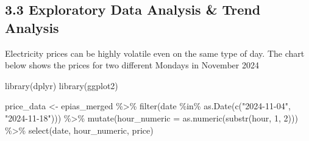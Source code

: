 \documentclass[
  11pt,
  a4paper,
]{article}
\newenvironment{Shaded}{\begin{snugshade}}{\end{snugshade}}
\newcommand{\AttributeTok}[1]{\textcolor[rgb]{0.40,0.45,0.13}{#1}}
\newcommand{\DecValTok}[1]{\textcolor[rgb]{0.68,0.00,0.00}{#1}}
\newcommand{\FunctionTok}[1]{\textcolor[rgb]{0.28,0.35,0.67}{#1}}
\newcommand{\NormalTok}[1]{\textcolor[rgb]{0.00,0.23,0.31}{#1}}
\newcommand{\OtherTok}[1]{\textcolor[rgb]{0.00,0.23,0.31}{#1}}
\newcommand{\SpecialCharTok}[1]{\textcolor[rgb]{0.37,0.37,0.37}{#1}}
\newcommand{\StringTok}[1]{\textcolor[rgb]{0.13,0.47,0.30}{#1}}
\begin{document}
\subsection{3.3 Exploratory Data Analysis \& Trend
Analysis}\label{exploratory-data-analysis-trend-analysis}

Electricity prices can be highly volatile even on the same type of day.
The chart below shows the prices for two different Mondays in November
2024

\begin{Shaded}
\begin{Highlighting}[]
\FunctionTok{library}\NormalTok{(dplyr)}
\FunctionTok{library}\NormalTok{(ggplot2)}

\NormalTok{price\_data }\OtherTok{\textless{}{-}}\NormalTok{ epias\_merged }\SpecialCharTok{\%\textgreater{}\%}
  \FunctionTok{filter}\NormalTok{(date }\SpecialCharTok{\%in\%} \FunctionTok{as.Date}\NormalTok{(}\FunctionTok{c}\NormalTok{(}\StringTok{"2024{-}11{-}04"}\NormalTok{, }\StringTok{"2024{-}11{-}18"}\NormalTok{))) }\SpecialCharTok{\%\textgreater{}\%}
  \FunctionTok{mutate}\NormalTok{(}\AttributeTok{hour\_numeric =} \FunctionTok{as.numeric}\NormalTok{(}\FunctionTok{substr}\NormalTok{(hour, }\DecValTok{1}\NormalTok{, }\DecValTok{2}\NormalTok{))) }\SpecialCharTok{\%\textgreater{}\%}
  \FunctionTok{select}\NormalTok{(date, hour\_numeric, price)}


\end{Highlighting}
\end{Shaded}
\end{document}
